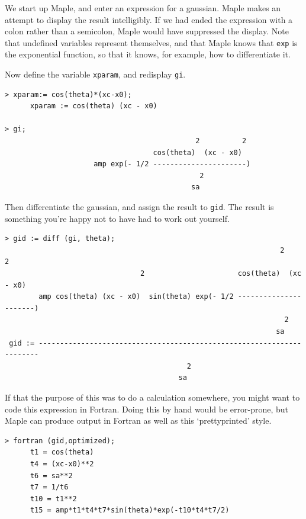 \documentclass[11pt,oneside,chapters]{starlink}
\begin{document}
We start up Maple, and enter an expression for a gaussian.
Maple makes an attempt to display the result intelligibly.
If we had ended the expression with a colon rather than a
semicolon, Maple would have suppressed the display.  Note
that undefined variables represent themselves, and that
Maple knows that \texttt{exp} is the exponential
function, so that it knows, for example, how to
differentiate it.

Now define the variable \texttt{xparam}, and redisplay
\texttt{gi}.

\begin{verbatim}
> xparam:= cos(theta)*(xc-x0);
      xparam := cos(theta) (xc - x0)

> gi;
                                             2          2
                                   cos(theta)  (xc - x0)
                     amp exp(- 1/2 ----------------------)
                                              2
                                            sa
\end{verbatim}

Then differentiate the gaussian, and assign the result to
\texttt{gid}.  The result is something you're happy not
to have had to work out yourself.

\begin{verbatim}
> gid := diff (gi, theta);
                                                                 2          2
                                2                      cos(theta)  (xc - x0)
        amp cos(theta) (xc - x0)  sin(theta) exp(- 1/2 ----------------------)
                                                                  2
                                                                sa
 gid := ----------------------------------------------------------------------
                                           2
                                         sa
\end{verbatim}

If that the purpose of this was to do a calculation
somewhere, you might want to code this expression in
Fortran.  Doing this by hand would be error-prone, but Maple
can produce output in Fortran as well as this
`prettyprinted' style.

\begin{verbatim}
> fortran (gid,optimized);
      t1 = cos(theta)
      t4 = (xc-x0)**2
      t6 = sa**2
      t7 = 1/t6
      t10 = t1**2
      t15 = amp*t1*t4*t7*sin(theta)*exp(-t10*t4*t7/2)
\end{verbatim}
\end{document}
